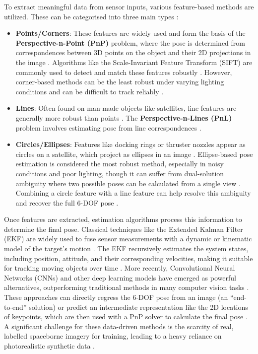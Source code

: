 \noindent
To extract meaningful data from sensor inputs, various feature-based methods are utilized. These can be categorised into three main types \cite{Meng}:
\begin{itemize}
    \item \textbf{Points/Corners}: These features are widely used and form the basis of the \textbf{Perspective-n-Point (PnP)} problem, where the pose is determined from correspondences between 3D points on the object and their 2D projections in the image \cite{Meng, Kisantal, deJongh2019}. Algorithms like the Scale-Invariant Feature Transform (SIFT) are commonly used to detect and match these features robustly \cite{Kisantal}. However, corner-based methods can be the least robust under varying lighting conditions and can be difficult to track reliably \cite{Meng}.
    \item \textbf{Lines}: Often found on man-made objects like satellites, line features are generally more robust than points \cite{Meng}. The \textbf{Perspective-n-Lines (PnL)} problem involves estimating pose from line correspondences \cite{Meng}.
    \item \textbf{Circles/Ellipses}: Features like docking rings or thruster nozzles appear as circles on a satellite, which project as ellipses in an image \cite{Meng, Sabatini}. Ellipse-based pose estimation is considered the most robust method, especially in noisy conditions and poor lighting, though it can suffer from dual-solution ambiguity where two possible poses can be calculated from a single view \cite{Meng, Kisantal}. Combining a circle feature with a line feature can help resolve this ambiguity and recover the full 6-DOF pose \cite{Meng}.
\end{itemize}

\noindent
Once features are extracted, estimation algorithms process this information to determine the final pose. Classical techniques like the Extended Kalman Filter (EKF) are widely used to fuse sensor measurements with a dynamic or kinematic model of the target's motion \cite{Kisantal, Sabatini, deJongh2019, Korf}. The EKF recursively estimates the system states, including position, attitude, and their corresponding velocities, making it suitable for tracking moving objects over time \cite{Kisantal, Sabatini}. More recently, Convolutional Neural Networks (CNNs) and other deep learning models have emerged as powerful alternatives, outperforming traditional methods in many computer vision tasks \cite{deJongh2019, Korf}. These approaches can directly regress the 6-DOF pose from an image (an ``end-to-end'' solution) or predict an intermediate representation like the 2D locations of keypoints, which are then used with a PnP solver to calculate the final pose \cite{Sabatini, Korf}. A significant challenge for these data-driven methods is the scarcity of real, labelled spaceborne imagery for training, leading to a heavy reliance on photorealistic synthetic data \cite{Kisantal, Korf}.

